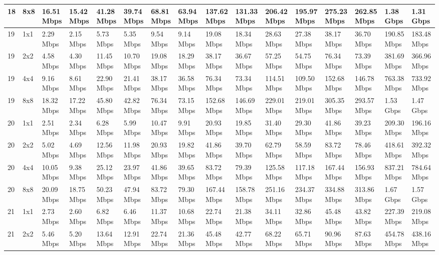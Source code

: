 \documentclass[12pt]{article}
\begin{document}
\begin{longtable}[c]{|l|l|l|l|l|l|l|l|l|l|l|l|l|l|l|l|}
18 & 8x8 & 16.51 Mbps & 15.42 Mbps & 41.28 Mbps & 39.74 Mbps & 68.81 Mbps & 63.94 Mbps & 137.62 Mbps & 131.33 Mbps & 206.42 Mbps & 195.97 Mbps & 275.23 Mbps & 262.85 Mbps & 1.38 Gbps & 1.31 Gbps \\ \hline
19 & 1x1 & 2.29 Mbps & 2.15 Mbps & 5.73 Mbps & 5.35 Mbps & 9.54 Mbps & 9.14 Mbps & 19.08 Mbps & 18.34 Mbps & 28.63 Mbps & 27.38 Mbps & 38.17 Mbps & 36.70 Mbps & 190.85 Mbps & 183.48 Mbps \\ \hline
19 & 2x2 & 4.58 Mbps & 4.30 Mbps & 11.45 Mbps & 10.70 Mbps & 19.08 Mbps & 18.29 Mbps & 38.17 Mbps & 36.67 Mbps & 57.25 Mbps & 54.75 Mbps & 76.34 Mbps & 73.39 Mbps & 381.69 Mbps & 366.96 Mbps \\ \hline
19 & 4x4 & 9.16 Mbps & 8.61 Mbps & 22.90 Mbps & 21.41 Mbps & 38.17 Mbps & 36.58 Mbps & 76.34 Mbps & 73.34 Mbps & 114.51 Mbps & 109.50 Mbps & 152.68 Mbps & 146.78 Mbps & 763.38 Mbps & 733.92 Mbps \\ \hline
19 & 8x8 & 18.32 Mbps & 17.22 Mbps & 45.80 Mbps & 42.82 Mbps & 76.34 Mbps & 73.15 Mbps & 152.68 Mbps & 146.69 Mbps & 229.01 Mbps & 219.01 Mbps & 305.35 Mbps & 293.57 Mbps & 1.53 Gbps & 1.47 Gbps \\ \hline
20 & 1x1 & 2.51 Mbps & 2.34 Mbps & 6.28 Mbps & 5.99 Mbps & 10.47 Mbps & 9.91 Mbps & 20.93 Mbps & 19.85 Mbps & 31.40 Mbps & 29.30 Mbps & 41.86 Mbps & 39.23 Mbps & 209.30 Mbps & 196.16 Mbps \\ \hline
20 & 2x2 & 5.02 Mbps & 4.69 Mbps & 12.56 Mbps & 11.98 Mbps & 20.93 Mbps & 19.82 Mbps & 41.86 Mbps & 39.70 Mbps & 62.79 Mbps & 58.59 Mbps & 83.72 Mbps & 78.46 Mbps & 418.61 Mbps & 392.32 Mbps \\ \hline
20 & 4x4 & 10.05 Mbps & 9.38 Mbps & 25.12 Mbps & 23.97 Mbps & 41.86 Mbps & 39.65 Mbps & 83.72 Mbps & 79.39 Mbps & 125.58 Mbps & 117.18 Mbps & 167.44 Mbps & 156.93 Mbps & 837.21 Mbps & 784.64 Mbps \\ \hline
20 & 8x8 & 20.09 Mbps & 18.75 Mbps & 50.23 Mbps & 47.94 Mbps & 83.72 Mbps & 79.30 Mbps & 167.44 Mbps & 158.78 Mbps & 251.16 Mbps & 234.37 Mbps & 334.88 Mbps & 313.86 Mbps & 1.67 Gbps & 1.57 Gbps \\ \hline
21 & 1x1 & 2.73 Mbps & 2.60 Mbps & 6.82 Mbps & 6.46 Mbps & 11.37 Mbps & 10.68 Mbps & 22.74 Mbps & 21.38 Mbps & 34.11 Mbps & 32.86 Mbps & 45.48 Mbps & 43.82 Mbps & 227.39 Mbps & 219.08 Mbps \\ \hline
21 & 2x2 & 5.46 Mbps & 5.20 Mbps & 13.64 Mbps & 12.91 Mbps & 22.74 Mbps & 21.36 Mbps & 45.48 Mbps & 42.77 Mbps & 68.22 Mbps & 65.71 Mbps & 90.96 Mbps & 87.63 Mbps & 454.78 Mbps & 438.16 Mbps \\ \hline

\end{longtable}
\end{document}
